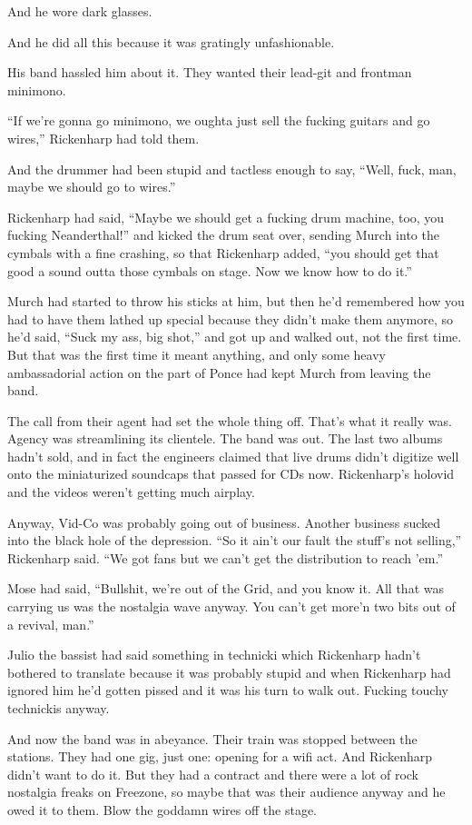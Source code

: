 And he wore dark glasses.

And he did all this because it was gratingly unfashionable.

His band hassled him about it. They wanted their lead-git and frontman minimono.

“If we’re gonna go minimono, we oughta just sell the fucking guitars and go wires,” Rickenharp had told them.

And the drummer had been stupid and tactless enough to say, “Well, fuck, man, maybe we should go to wires.”

Rickenharp had said, “Maybe we should get a fucking drum machine, too, you fucking Neanderthal!” and kicked the drum seat over, sending Murch into the cymbals with a fine crashing, so that Rickenharp added, “you should get that good a sound outta those cymbals on stage. Now we know how to do it.”

Murch had started to throw his sticks at him, but then he’d remembered how you had to have them lathed up special because they didn’t make them anymore, so he’d said, “Suck my ass, big shot,” and got up and walked out, not the first time. But that was the first time it meant anything, and only some heavy ambassadorial action on the part of Ponce had kept Murch from leaving the band.

The call from their agent had set the whole thing off. That’s what it really was. Agency was streamlining its clientele. The band was out. The last two albums hadn’t sold, and in fact the engineers claimed that live drums didn’t digitize well onto the miniaturized soundcaps that passed for CDs now. Rickenharp’s holovid and the videos weren’t getting much airplay.

Anyway, Vid-Co was probably going out of business. Another business sucked into the black hole of the depression. “So it ain’t our fault the stuff’s not selling,” Rickenharp said. “We got fans but we can’t get the distribution to reach ’em.”

Mose had said, “Bullshit, we’re out of the Grid, and you know it. All that was carrying us was the nostalgia wave anyway. You can’t get more’n two bits out of a revival, man.”

Julio the bassist had said something in technicki which Rickenharp hadn’t bothered to translate because it was probably stupid and when Rickenharp had ignored him he’d gotten pissed and it was his turn to walk out. Fucking touchy technickis anyway.

And now the band was in abeyance. Their train was stopped between the stations. They had one gig, just one: opening for a wifi act. And Rickenharp didn’t want to do it. But they had a contract and there were a lot of rock nostalgia freaks on Freezone, so maybe that was their audience anyway and he owed it to them. Blow the goddamn wires off the stage.

